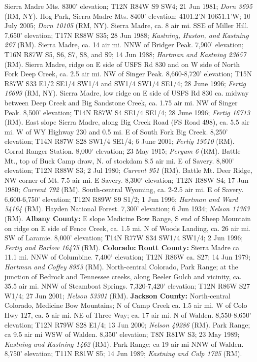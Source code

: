 Sierra Madre Mts. 8300’ elevation; T12N R84W S9 SW4; 21 Jun 1981;
\textit{Dorn 3695} (RM, NY).
Hog Park, Sierra Madre Mts. 8400’ elevation; 4101.2’N 10651.1’W; 10 July 2005;
\textit{Dorn 10105} (RM, NY).
Sierra Madre, ca. 8 air mi. SSE of Miller Hill. 7,650’ elevation; T17N R88W S35;
28 Jun 1988; \textit{Kastning, Huston, and Kastning 267} (RM).
Sierra Madre, ca. 14 air mi. NNW of Bridger Peak. 7,900’ elevation;
T16N R87W S5, S6, S7, S8, and S9; 14 Jun 1988;
\textit{Hartman and Kastning 23657} (RM).
Sierra Madre, ridge on E side of USFS Rd 830 and on W side of North Fork
Deep Creek, ca. 2.5 air mi. NW of Singer Peak. 8,660-8,720’ elevation;
T15N R87W S33 E1/2 SE1/4 SW1/4 and SW1/4 SW1/4 SE1/4; 28 June 1996;
\textit{Fertig 16699} (RM, NY).
Sierra Madre, low ridge on E side of USFS Rd 830 ca. midway between Deep Creek
and Big Sandstone Creek, ca. 1.75 air mi. NW of Singer Peak. 8,500’ elevation;
T14N R87W S4 SE1/4 SE1/4; 28 June 1996; \textit{Fertig 16713} (RM).
East slope Sierra Madre, along Big Creek Road (FS Road 498), ca. 5.5 air mi. W
of WY Highway 230 and 0.5 mi. E of South Fork Big Creek. 8,250’ elevation;
T14N R87W S28 SW1/4 SE1/4; 6 June 2001; \textit{Fertig 19510} (RM).
Corral Ranger Station. 8,000’ elevation; 23 May 1915; \textit{Peryam 6} (RM).
Battle Mt., top of Buck Camp draw, N. of stockdam 8.5 air mi. E of Savery.
8,800’ elevation; T12N R88W S3; 2 Jul 1980; \textit{Current 951} (RM).
Battle Mt. Deer Ridge, NW corner of Mt.  7.5 air mi. E Savery.
8,300’ elevation; T12N R88W S4; 17 Jun 1980; \textit{Current 792} (RM).
South-central Wyoming, ca. 2-2.5 air mi. E of Savery. 6,600-6,750’ elevation;
T12N R89W S9 S1/2; 1 Jun 1996; \textit{Hartman and Ward 54164} (RM).
Hayden National Forest. 7,300' elevation; 6 Jun 1934;
\textit{Nelson 11363} (RM).
  \textbf{Albany County:}
E slope Medicine Bow Range, S end of Sheep Mountain on ridge on E side of Fence
Creek, ca. 1.5 mi. N of Woods Landing, ca. 26 air mi. SW of Laramie.
8,000' elevation; T14N R77W S34 SW1/4 SW1/4; 2 Jun 1996;
\textit{Fertig and Barlow 16475} (RM).
  \textbf{Colorado:}
  \textbf{Routt County:}
Sierra Madre ca 11.1 mi. NNW of Columbine.  7,400' elevation; T12N R86W ca. S27;
14 Jun 1979; \textit{Hartman and Coffey 8953} (RM).
North-central Colorado, Park Range; at the junction of Bedrock and Tennessee
creeks, along Beeler Gulch and vicinity, ca. 35.5 air mi. NNW of Steamboat
Springs. 7,320-7,420' elevation; T12N R86W S27 W1/4; 27 Jun 2001;
\textit{Nelson 53301} (RM).
  \textbf{Jackson County:}
North-central Colorado, Medicine Bow Mountains; N of Camp Creek ca. 1.5 air
mi. W of Colo Hwy 127, ca. 5 air mi. NE of Three Way; ca. 17 air mi. N of
Walden.  8,550-8,650' elevation; T12N R79W S28 E1/4; 13 Jun 2000;
\textit{Nelson 49286} (RM).
Park Range; ca 9.5 air mi WSW of Walden. 8,350' elevation; T8N R81W S3;
23 May 1989; \textit{Kastning and Kastning 1462} (RM).
Park Range; ca 19 air mi NNW of Walden. 8,750' elevation;
T11N R81W S5; 14 Jun 1989; \textit{Kastning and Culp 1725} (RM).

